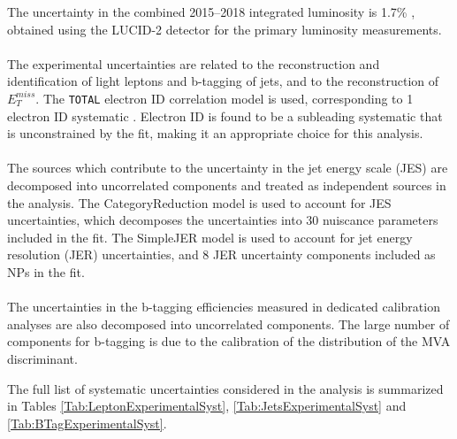 The uncertainty in the combined 2015--2018 integrated luminosity is 1.7\% \cite{ATLAS:2019pzw}, obtained using the LUCID-2 detector \cite{LUCID2} for the primary luminosity measurements.

\paragraph{}
The experimental uncertainties are related to the reconstruction and identification of light leptons and b-tagging of jets, and to the reconstruction of $E^{miss}_T$. The \verb!TOTAL! electron ID correlation model is used, corresponding to 1 electron ID systematic \cite{ele_eff}. Electron ID is found to be a subleading systematic that is unconstrained by the fit, making it an appropriate choice for this analysis.

\paragraph{}
The sources which contribute to the uncertainty in the jet energy scale (JES) \cite{PERF-2016-04} are decomposed into uncorrelated components and treated as independent sources in the analysis. The CategoryReduction model is used to account for JES uncertainties, which decomposes the uncertainties into 30 nuiscance parameters included in the fit. The SimpleJER model is used to account for jet energy resolution (JER) uncertainties, and 8 JER uncertainty components included as NPs in the fit. 

\paragraph{}
The uncertainties in the b-tagging efficiencies measured in dedicated calibration analyses \cite{btag_cal} are also decomposed into uncorrelated components. The large number of components for b-tagging is due to the calibration of the distribution of the MVA discriminant.  


The full list of systematic uncertainties considered in the analysis is summarized in Tables
\ref{Tab:LeptonExperimentalSyst}, \ref{Tab:JetsExperimentalSyst} and \ref{Tab:BTagExperimentalSyst}.

